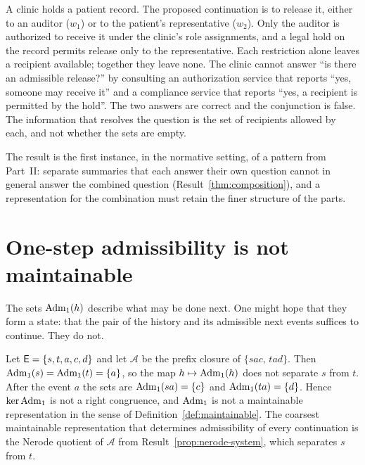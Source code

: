 \begin{example}
A clinic holds a patient record. The proposed continuation is to release it, either to an auditor ($w_1$) or to the patient's representative ($w_2$). Only the auditor is authorized to receive it under the clinic's role assignments, and a legal hold on the record permits release only to the representative. Each restriction alone leaves a recipient available; together they leave none. The clinic cannot answer ``is there an admissible release?'' by consulting an authorization service that reports ``yes, someone may receive it'' and a compliance service that reports ``yes, a recipient is permitted by the hold''. The two answers are correct and the conjunction is false. The information that resolves the question is the set of recipients allowed by each, and not whether the sets are empty.
\end{example}

The result is the first instance, in the normative setting, of a pattern from Part~II: separate summaries that each answer their own question cannot in general answer the combined question (Result~\ref{thm:composition}), and a representation for the combination must retain the finer structure of the parts.

\section{One-step admissibility is not maintainable}

The sets $\operatorname{Adm}_1(h)$ describe what may be done next. One might hope that they form a state: that the pair of the history and its admissible next events suffices to continue. They do not.

\begin{example}\label{ex:not-maintainable}
Let $\mathsf{E}=\{s,t,a,c,d\}$ and let $\mathcal A$ be the prefix closure of $\{sac,\,tad\}$. Then $\operatorname{Adm}_1(s)=\operatorname{Adm}_1(t)=\{a\}$, so the map $h\mapsto\operatorname{Adm}_1(h)$ does not separate $s$ from $t$. After the event $a$ the sets are $\operatorname{Adm}_1(sa)=\{c\}$ and $\operatorname{Adm}_1(ta)=\{d\}$. Hence $\ker\operatorname{Adm}_1$ is not a right congruence, and $\operatorname{Adm}_1$ is not a maintainable representation in the sense of Definition~\ref{def:maintainable}. The coarsest maintainable representation that determines admissibility of every continuation is the Nerode quotient of $\mathcal A$ from Result~\ref{prop:nerode-system}, which separates $s$ from $t$.
\end{example}

